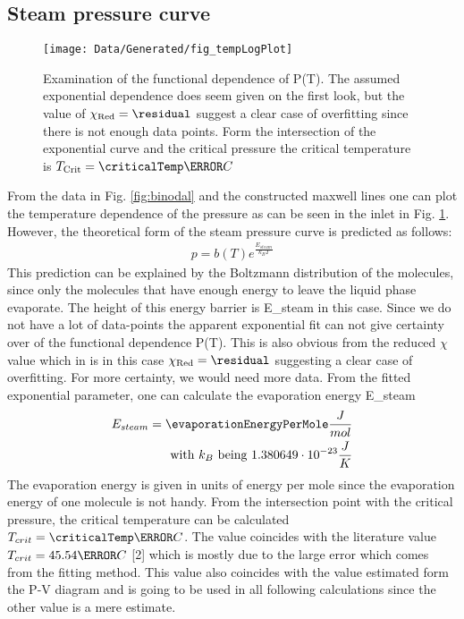 \documentclass[a4paper,10pt,twocolumn]{article}
\begin{document}
    \subsection{Steam pressure curve}\label{subsec:steamPressureCurve}
    \begin{figure}
        \begin{center}
            \texttt{[image: Data/Generated/fig\_tempLogPlot]}\label{fig:tempLogPLot}
            \caption[]{Examination of the functional dependence of P(T). The assumed exponential dependence does seem given on the first look, but the value of $\chi_{\text{Red}}=\residual$ suggest a clear case of overfitting since there is
            not enough data points. Form the intersection of the exponential curve and the critical pressure the critical temperature is $T_{\text{Crit}}=\criticalTemp\degree C$}
        \end{center}
    \end{figure}
    From the data in Fig. \ref{fig:binodal} and the constructed maxwell lines one can plot the temperature dependence of the pressure as can be seen in the inlet in Fig. \ref{fig:tempLogPLot}.
    However, the theoretical form of the steam pressure curve is predicted as follows:
    \begin{align}
        p=b(T)e^\frac{E_{steam}}{k_B T}
    \end{align}
    This prediction can be explained by the Boltzmann distribution of the molecules, since only the molecules that have enough energy to leave the liquid phase evaporate.
    The height of this energy barrier is E_{steam}\) in this case.
    Since we do not have a lot of data-points the apparent exponential fit can not give certainty over of the functional dependence P(T).
    This is also obvious from the reduced $\chi$ value which in is in this case $\chi_{\text{Red}}=\residual$ suggesting a clear case of overfitting.
    For more certainty, we would need more data.
    From the fitted exponential parameter, one can calculate the evaporation energy E_{steam}\)
    \begin{align}
        E_{steam} = \evaporationEnergyPerMole \frac{J}{mol}
        \endline \text{with } k_B \text{ being } 1.380649\cdot 10^{-23}\frac{J}{K}
    \end{align}
    The evaporation energy is given in units of energy per mole since the evaporation energy of one molecule is not handy. 
    From the intersection point with the critical pressure, the critical temperature can be calculated $T_{crit}=\criticalTemp\degree C $.
    The value coincides with the literature value $T_{crit} = 45.54\degree C$ [2] which is mostly due to the large error which comes from the fitting method.
    This value also coincides with the value estimated form the P-V diagram and is going to be used in all following calculations since the other value is a mere estimate.
    
\end{document}
